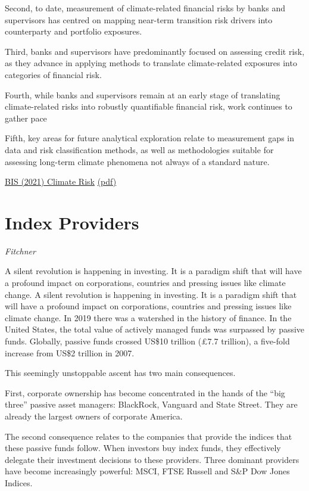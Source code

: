 \documentclass[
]{book}
\begin{document}
Second, to date, measurement of climate-related financial risks by banks and supervisors
has centred on mapping near-term transition risk drivers into counterparty and portfolio exposures.

Third, banks and supervisors have predominantly focused on assessing credit risk, as they
advance in applying methods to translate climate-related exposures into categories of financial risk.

Fourth, while banks and supervisors remain at an early stage of translating climate-related
risks into robustly quantifiable financial risk, work continues to gather pace

Fifth, key areas for future analytical exploration relate to measurement gaps in data and
risk classification methods, as well as methodologies suitable for assessing long-term climate
phenomena not always of a standard nature.

\href{https://www.bis.org/bcbs/publ/d518.htm}{BIS (2021) Climate Risk}
\href{pdf/BIS_2021_Climate_Risk.pdf}{(pdf)}

\hypertarget{index-providers}{%
\section{Index Providers}\label{index-providers}}

\emph{Fitchner}

A silent revolution is happening in investing. It is a paradigm shift that will have a profound impact on corporations, countries and pressing issues like climate change.
A silent revolution is happening in investing. It is a paradigm shift that will have a profound impact on corporations, countries and pressing issues like climate change.
In 2019 there was a watershed in the history of finance. In the United States, the total value of actively managed funds was surpassed by passive funds. Globally, passive funds crossed US\$10 trillion (£7.7 trillion), a five-fold increase from US\$2 trillion in 2007.

This seemingly unstoppable ascent has two main consequences.

First, corporate ownership has become concentrated in the hands of the ``big three'' passive asset managers: BlackRock, Vanguard and State Street. They are already the largest owners of corporate America.

The second consequence relates to the companies that provide the indices that these passive funds follow. When investors buy index funds, they effectively delegate their investment decisions to these providers. Three dominant providers have become increasingly powerful: MSCI, FTSE Russell and S\&P Dow Jones Indices.
\end{document}
